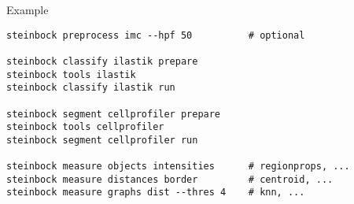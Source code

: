 \documentclass[aspectratio=169]{beamer}
\begin{document}
\begin{frame}[fragile]{Example}
	
\begin{verbatim}
steinbock preprocess imc --hpf 50          # optional

steinbock classify ilastik prepare
steinbock tools ilastik
steinbock classify ilastik run

steinbock segment cellprofiler prepare
steinbock tools cellprofiler
steinbock segment cellprofiler run

steinbock measure objects intensities      # regionprops, ...
steinbock measure distances border         # centroid, ...
steinbock measure graphs dist --thres 4    # knn, ...

\end{verbatim}
	
\end{frame}
\end{document}
